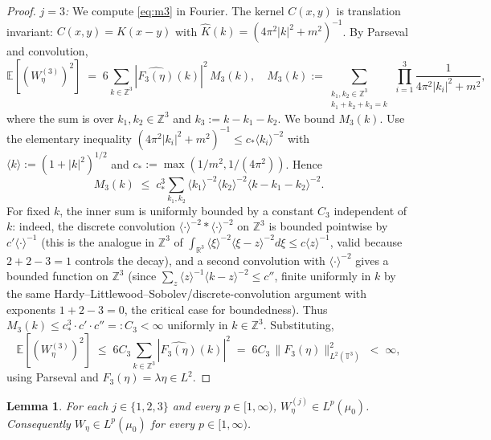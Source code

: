 \documentclass[12pt]{article}
\newtheorem{lemma}[theorem]{Lemma}
\theoremstyle{definition}
\begin{document}
\begin{proof}
\emph{$j=3$:} We compute \eqref{eq:m3} in Fourier. The kernel $C(x,y)$ is translation
invariant: $C(x,y)=K(x-y)$ with $\widehat K(k)=(4\pi^2|k|^2+m^2)^{-1}$. By Parseval and
convolution,
\begin{equation}\label{eq:m3-Fourier}
\mathbb{E}[(W_\eta^{(3)})^2]
\;=\; 6\sum_{k\in\mathbb{Z}^3}|\widehat{F_3(\eta)}(k)|^2\,M_3(k),
\quad
M_3(k):=\sum_{\substack{k_1,k_2\in\mathbb{Z}^3 \\ k_1+k_2+k_3=k}}\,
\prod_{i=1}^{3}\!\frac{1}{4\pi^2|k_i|^2+m^2},
\end{equation}
where the sum is over $k_1,k_2\in\mathbb{Z}^3$ and $k_3:=k-k_1-k_2$. We bound $M_3(k)$.
Use the elementary inequality $(4\pi^2|k_i|^2+m^2)^{-1}\le c_*\langle k_i\rangle^{-2}$ with
$\langle k\rangle:=(1+|k|^2)^{1/2}$ and $c_*:=\max(1/m^2, 1/(4\pi^2))$. Hence
\[
M_3(k)\;\le\; c_*^3\!\sum_{k_1,k_2}\langle k_1\rangle^{-2}\langle k_2\rangle^{-2}\langle k-k_1-k_2\rangle^{-2}.
\]
For fixed $k$, the inner sum is uniformly bounded by a constant $C_3$ independent of $k$:
indeed, the discrete convolution $\langle\cdot\rangle^{-2}*\langle\cdot\rangle^{-2}$ on
$\mathbb{Z}^3$ is bounded pointwise by $c'\langle\cdot\rangle^{-1}$ (this is the analogue
in $\mathbb{Z}^3$ of $\int_{\mathbb{R}^3}\langle\xi\rangle^{-2}\langle\xi-z\rangle^{-2}d\xi
\le c\langle z\rangle^{-1}$, valid because
$2+2-3=1$ controls the decay), and a second convolution with $\langle\cdot\rangle^{-2}$
gives a bounded function on $\mathbb{Z}^3$ (since
$\sum_z \langle z\rangle^{-1}\langle k-z\rangle^{-2}\le c''$, finite uniformly in $k$ by the
same Hardy--Littlewood--Sobolev/discrete-convolution argument with exponents $1+2-3=0$, the
critical case for boundedness). Thus $M_3(k)\le c_*^3\cdot c'\cdot c''=:C_3<\infty$
uniformly in $k\in\mathbb{Z}^3$. Substituting,
\[
\mathbb{E}[(W_\eta^{(3)})^2]\;\le\;6C_3\sum_{k\in\mathbb{Z}^3}|\widehat{F_3(\eta)}(k)|^2
\;=\;6C_3\,\|F_3(\eta)\|_{L^2(\mathbb{T}^3)}^2\;<\;\infty,
\]
using Parseval and $F_3(\eta)=\lambda\eta\in L^2$.
\end{proof}

\begin{lemma}\label{lem:WickLp}
For each $j\in\{1,2,3\}$ and every $p\in[1,\infty)$, $W_\eta^{(j)}\in L^p(\mu_0)$.
Consequently $W_\eta\in L^p(\mu_0)$ for every $p\in[1,\infty)$.
\end{lemma}
\end{document}
